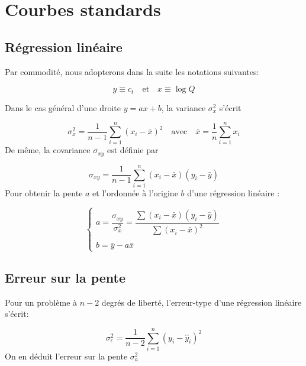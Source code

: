 \documentclass[a4paper,10pt]{article}
\begin{document}
\section{Courbes standards}

\subsection{Régression linéaire}

Par commodité, nous adopterons dans la suite les notations suivantes:

\begin{equation}
 y\equiv c_t \quad \text{et} \quad x\equiv\log Q
\end{equation}

Dans le cas général d'une droite $y=ax+b$, la variance $\sigma_x^2$ s'écrit

\begin{equation}
\sigma_x^2=\displaystyle\frac{1}{n-1}\sum_{i=1}^{n}(x_i-\bar{x})^2
\quad\text{avec}\quad \bar{x}=\frac{1}{n}\sum_{i=1}^{n}x_i
\end{equation}
De même, la covariance $\sigma_{xy}$ est définie par

\begin{equation}
 \sigma_{xy} =
\displaystyle\frac{1}{n-1}\sum_{i=1}^{n}(x_i-\bar{x})(y_i-\bar{y})
\end{equation}
Pour obtenir la pente $a$ et l'ordonnée à l'origine $b$ d'une régression linéaire :

\begin{equation}
 \left\lbrace 
\begin{array}{l}
 a = \dfrac{\sigma_{xy}}{\sigma_x^2}=\dfrac{\sum(x_i-\bar{x})(y_i-\bar{y})}{\sum(x_i-\bar{x})^2} \\ \\
 b = \bar{y}-a\bar{x}
\end{array}
\right.
\end{equation}


\subsection{Erreur sur la pente}

Pour un problème à $n-2$ degrés de liberté, l'erreur-type d'une régression
linéaire s'écrit:

\begin{equation}
 \sigma_{\epsilon}^2 = \displaystyle\frac{1}{n-2}\sum_{i=1}^{n}(y_i-\hat{y}_i)^2
\end{equation}
On en déduit l'erreur sur la pente $\sigma_a^2$
\end{document}
